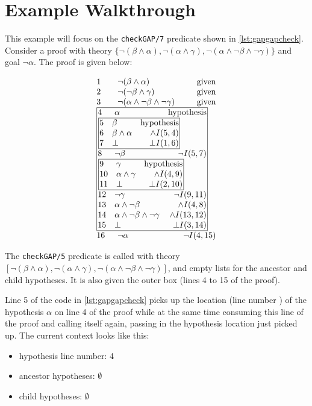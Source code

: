 \documentclass[11pt,twoside,a4paper]{report}
\begin{document}
\section{Example Walkthrough}
This example will focus on the \lstinline$checkGAP/7$ predicate shown in \autoref{lst:gapgapcheck}. Consider a proof with theory $\{\neg(\beta\wedge\alpha), \neg(\alpha\wedge\gamma), \neg(\alpha\wedge\neg\beta\wedge\neg\gamma)\}$ and goal $\neg\alpha$. The proof is given below: 

\[\vbox{\offinterlineskip\halign{
&\tabskip=1.5em#\strut&$#$\hfil\tabskip=1em&\hfil$#$\tabskip=0em\cr
%
1&\neg(\beta\wedge\alpha)&\mbox{given}\cr
2&\neg(\neg\beta\wedge\gamma)&\mbox{given}\cr
3&\neg(\alpha\wedge\neg\beta\wedge\neg\gamma)&\mbox{given}\cr
%
\multispan3\vbox{\halign{
\vrule#&&\hskip.1em\tabskip=1em#\strut&$#$\hfil\tabskip=1em&\hfil$#$\hskip0.1em\tabskip=0em&\vrule#\cr
\noalign{\hrule}
%
&4&\alpha&\mbox{hypothesis}&\cr
%
&\multispan3\,\vbox{\halign{
\vrule#&&\hskip.1em\tabskip=1em#\strut&$#$\hfil\tabskip=1em&\hfil$#$\hskip0.1em\tabskip=0em&\vrule#\cr
\noalign{\hrule}
%
&5&\beta&\mbox{hypothesis}&\cr
&6&\beta\wedge\alpha&\wedge I(5,4)&\cr
&7&\bot&\bot I(1,6)&\cr
%
\noalign{\hrule}}}\,&\cr
%
&8&\neg\beta&\neg I(5,7)&\cr
%
&\multispan3\,\vbox{\halign{
\vrule#&&\hskip.1em\tabskip=1em#\strut&$#$\hfil\tabskip=1em&\hfil$#$\hskip0.1em\tabskip=0em&\vrule#\cr
\noalign{\hrule}
%
&9&\gamma&\mbox{hypothesis}&\cr
&10&\alpha\wedge\gamma&\wedge I(4,9)&\cr
&11&\bot&\bot I(2,10)&\cr
%
\noalign{\hrule}}}\,&\cr
%
&12&\neg\gamma&\neg I(9,11)&\cr
&13&\alpha\wedge\neg\beta&\wedge I(4,8)&\cr
&14&\alpha\wedge\neg\beta\wedge\neg\gamma&\wedge I(13,12)&\cr
&15&\bot&\bot I(3,14)&\cr
%
\noalign{\hrule}}}\,\cr
%
16&\neg\alpha&\neg I(4,15)\cr
}}\]

The \lstinline$checkGAP/5$ predicate is called with theory $[\neg(\beta\wedge\alpha), \neg(\alpha\wedge\gamma), \neg(\alpha\wedge\neg\beta\wedge\neg\gamma)]$, and empty lists for the ancestor and child hypotheses. It is also given the outer box (lines 4 to 15 of the proof). 

Line 5 of the code in \autoref{lst:gapgapcheck} picks up the location (line number ) of the hypothesis $\alpha$ on line 4 of the proof while at the same time consuming this line of the proof and calling itself again, passing in the hypothesis location just picked up. The current context looks like this:
\begin{itemize}
\item
hypothesis line number: 4
\item
ancestor hypotheses: $\emptyset$
\item
child hypotheses: $\emptyset$
\end{itemize}
\end{document}
